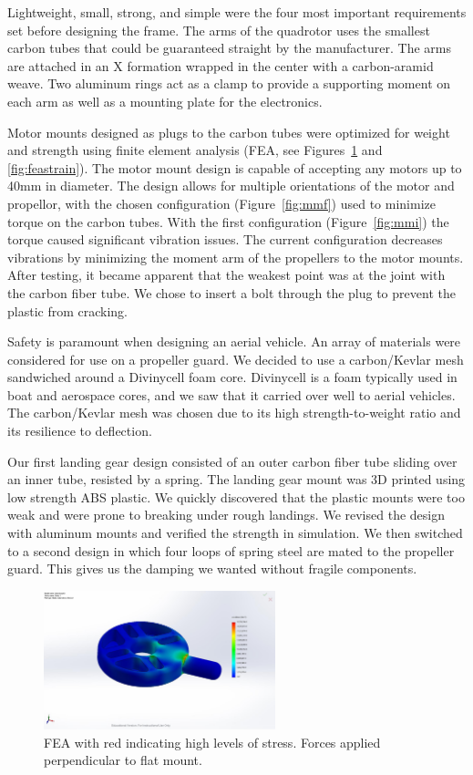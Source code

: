 \documentclass[12pt,letterpaper]{article} \usepackage[margin=1in]{geometry}
\begin{document}
Lightweight, small, strong, and simple were the four most important
requirements set before designing the frame. The arms of the quadrotor uses the
smallest carbon tubes that could be guaranteed straight by the manufacturer.
The arms are attached in an X formation wrapped in the center with
a carbon-aramid weave. Two aluminum rings act as a clamp to provide
a supporting moment on each arm as well as a mounting plate for the
electronics.

Motor mounts designed as plugs to the carbon tubes were optimized for weight
and strength using finite element analysis (FEA, see
Figures~\ref{fig:feastress} and \ref{fig:feastrain}). The motor mount design is
capable of accepting any motors up to 40mm in diameter. The design allows for
multiple orientations of the motor and propellor, with the chosen configuration
(Figure~\ref{fig:mmf}) used to minimize torque on the carbon tubes. With the
first configuration (Figure~\ref{fig:mmi}) the torque caused significant
vibration issues.  The current configuration decreases vibrations by minimizing
the moment arm of the propellers to the motor mounts. After testing, it became
apparent that the weakest point was at the joint with the carbon fiber tube. We
chose to insert a bolt through the plug to prevent the plastic from cracking.

Safety is paramount when designing an aerial vehicle. An array of materials were
considered for use on a propeller guard. We decided to use a carbon/Kevlar mesh
sandwiched around a Divinycell foam core. Divinycell is a foam typically used in
boat and aerospace cores, and we saw that it carried over well to aerial
vehicles. The carbon/Kevlar mesh was chosen due to its high strength-to-weight
ratio and its resilience to deflection.

Our first landing gear design consisted of an outer carbon fiber tube sliding
over an inner tube, resisted by a spring. The landing gear mount was 3D printed
using low strength ABS plastic. We quickly discovered that the plastic mounts
were too weak and were prone to breaking under rough landings. We revised the
design with aluminum mounts and verified the strength in simulation. We then
switched to a second design in which four loops of spring steel are mated to the
propeller guard. This gives us the damping we wanted without fragile components.

\begin{figure}[!h]
	\centering
	\includegraphics[width=0.6\textwidth]{img/fea_stress.jpg}
	\caption{FEA with red indicating high levels of stress. Forces applied perpendicular to flat mount.}
	\label{fig:feastress}
\end{figure}
 
\end{document}

